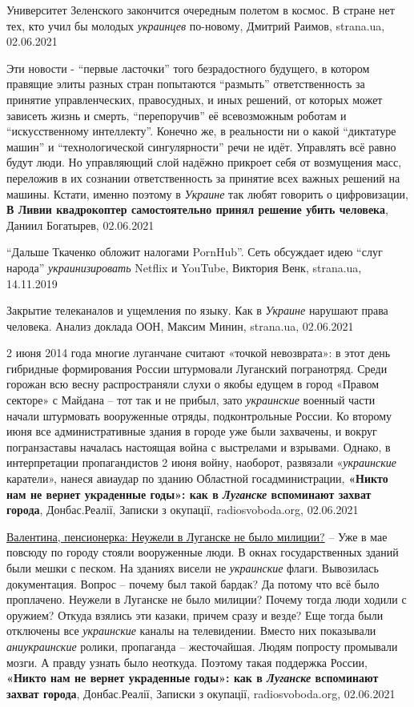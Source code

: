 Университет Зеленского закончится очередным полетом в космос. В стране нет тех,
кто учил бы молодых \emph{украинцев} по-новому, Дмитрий Раимов, strana.ua, 02.06.2021

Эти новости - \enquote{первые ласточки} того безрадостного будущего, в котором правящие
элиты разных стран попытаются \enquote{размыть} ответственность за принятие
управленческих, правосудных, и иных решений, от которых может зависеть жизнь и
смерть, \enquote{перепоручив} её всевозможным роботам и \enquote{искусственному интеллекту}.
Конечно же, в реальности ни о какой \enquote{диктатуре машин} и \enquote{технологической
сингулярности} речи не идёт. Управлять всё равно будут люди. Но управляющий
слой надёжно прикроет себя от возмущения масс, переложив в их сознании
ответственность за принятие всех важных решений на машины. Кстати, именно
поэтому в \emph{Украине} так любят говорить о цифровизации,
\textbf{В Ливии квадрокоптер самостоятельно принял решение убить человека}, Даниил Богатырев, 02.06.2021

\enquote{Дальше Ткаченко обложит налогами PornHub}. Сеть обсуждает идею \enquote{слуг народа} \emph{украинизировать} Netflix и YouTube,
Виктория Венк, strana.ua, 14.11.2019

Закрытие телеканалов и ущемления по языку. Как в \emph{Украине} нарушают права человека. Анализ доклада ООН,
Максим Минин, strana.ua, 02.06.2021

2 июня 2014 года многие луганчане считают «точкой невозврата»: в этот день
гибридные формирования России штурмовали Луганский погранотряд. Среди горожан
всю весну распространяли слухи о якобы едущем в город «Правом секторе» с
Майдана – тот так и не прибыл, зато \emph{украинские} военный части начали штурмовать
вооруженные отряды, подконтрольные России. Ко второму июня все административные
здания в городе уже были захвачены, и вокруг погранзаставы началась настоящая
война с выстрелами и взрывами. Однако, в интерпретации пропагандистов 2 июня
войну, наоборот, развязали «\emph{украинские} каратели», нанеся авиаудар по зданию
Областной госадминистрации,
\textbf{«Никто нам не вернет украденные годы»: как в \emph{Луганске} вспоминают захват города},
Донбас.Реалії, Записки з окупації, radiosvoboda.org, 02.06.2021

\underline{Валентина, пенсионерка: Неужели в Луганске не было милиции?}
– Уже в мае повсюду по городу стояли вооруженные люди. В окнах государственных
зданий были мешки с песком. На зданиях висели не \emph{украинские} флаги. Вывозилась
документация. Вопрос – почему был такой бардак? Да потому что всё было
проплачено. Неужели в Луганске не было милиции? Почему тогда люди ходили с
оружием? Откуда взялись эти казаки, причем сразу и везде? Еще тогда были
отключены все \emph{украинские} каналы на телевидении. Вместо них показывали
\emph{аниукраинские} ролики, пропаганда – жесточайшая. Людям попросту промывали мозги.
А правду узнать было неоткуда. Поэтому такая поддержка России,
\textbf{«Никто нам не вернет украденные годы»: как в \emph{Луганске} вспоминают захват города},
Донбас.Реалії, Записки з окупації, radiosvoboda.org, 02.06.2021


